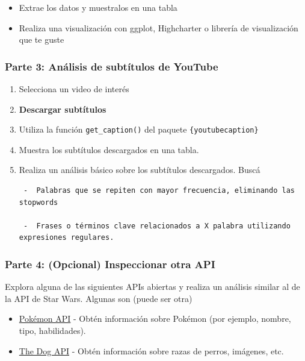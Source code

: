 \documentclass[
  letterpaper,
  DIV=11,
  numbers=noendperiod]{scrreprt}
\providecommand{\tightlist}{%
  \setlength{\itemsep}{0pt}\setlength{\parskip}{0pt}}\usepackage{longtable,booktabs,array}
\begin{document}
\begin{itemize}
\tightlist
\item
  Extrae los datos y muestralos en una tabla\\
\item
  Realiza una visualización con ggplot, Highcharter o librería de
  visualización que te guste
\end{itemize}

\subsubsection{Parte 3: Análisis de subtítulos de
YouTube}\label{parte-3-anuxe1lisis-de-subtuxedtulos-de-youtube}

\begin{enumerate}
\def\labelenumi{\arabic{enumi}.}
\item
  Selecciona un video de interés
\item
  \textbf{Descargar subtítulos}
\item
  Utiliza la función \texttt{get\_caption()} del paquete
  \texttt{\{youtubecaption\}}
\item
  Muestra los subtítulos descargados en una tabla.
\item
  Realiza un análisis básico sobre los subtítulos descargados. Buscá

\begin{verbatim}
 -  Palabras que se repiten con mayor frecuencia, eliminando las stopwords

 -  Frases o términos clave relacionados a X palabra utilizando expresiones regulares.
\end{verbatim}
\end{enumerate}

\subsubsection{Parte 4: (Opcional) Inspeccionar otra
API}\label{parte-4-opcional-inspeccionar-otra-api}

Explora alguna de las siguientes APIs abiertas y realiza un análisis
similar al de la API de Star Wars. Algunas son (puede ser otra)

\begin{itemize}
\item
  \href{https://pokeapi.co/}{Pokémon API} - Obtén información sobre
  Pokémon (por ejemplo, nombre, tipo, habilidades).
\item
  \href{https://thedogapi.com/}{The Dog API} - Obtén información sobre
  razas de perros, imágenes, etc.
\end{itemize}
\end{document}
